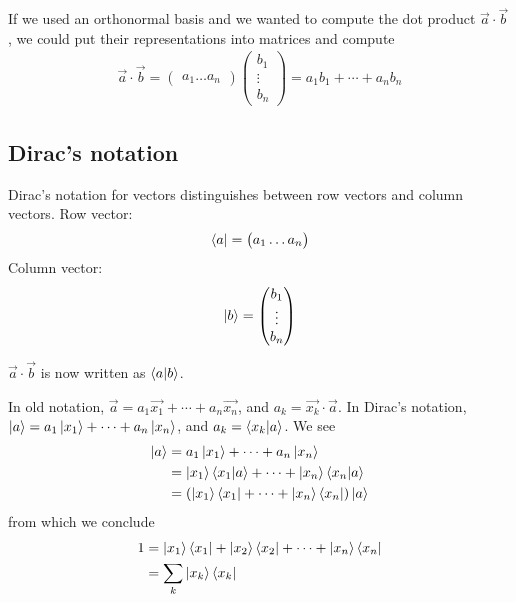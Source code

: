 \documentclass[12pt, oneside, letterpaper, fleqn]{article}
\begin{document}
If we used an orthonormal basis and we wanted to compute the dot product
$\vec{a} \cdot \vec{b}$, we could put their representations into
matrices and compute
\begin{align}
\vec{a} \cdot \vec{b} = \begin{pmatrix}
a_1 \hdots a_n
\end{pmatrix}
\begin{pmatrix}
b_1\\
\vdots\\
b_n
\end{pmatrix}
= a_1b_1 + \dotsb + a_nb_n
\end{align}

\subsection{Dirac's notation}
Dirac's notation for vectors distinguishes between row vectors and column
vectors. Row vector:
\begin{align}
\left\langle a\right\rvert = \begin{pmatrix}a_1 \hdots a_n\end{pmatrix}
\end{align}
Column vector:
\begin{align}
\left\lvert b\right\rangle = \begin{pmatrix}b_1\\
\vdots\\
b_n
\end{pmatrix}
\end{align}

$\vec{a} \cdot \vec{b}$ is now written as $\left\langle a\middle\vert b\right\rangle$.

In old notation, $\vec{a} = a_1\vec{x_1} +\dotsb+ a_n\vec{x_n}$, and
$a_k = \vec{x_k} \cdot \vec{a}$. In Dirac's notation, $\left\lvert a\right\rangle =
a_1\left\lvert x_1\right\rangle +\dotsb+ a_n\left\lvert x_n\right\rangle$, and $a_k = \left\langle x_k\middle\vert a\right\rangle$. We see
\begin{align*}
\left\lvert a\right\rangle &= a_1\left\lvert x_1\right\rangle +\dotsb+ a_n\left\lvert x_n\right\rangle\\
&= \left\lvert x_1\right\rangle\left\langle x_1\middle\vert a\right\rangle +\dotsb+ \left\lvert x_n\right\rangle\left\langle x_n\middle\vert a\right\rangle\\
&= \left(\left\lvert x_1\right\rangle\left\langle x_1\right\rvert +\dotsb+ \left\lvert x_n\right\rangle\left\langle x_n\right\rvert\right)\left\lvert a\right\rangle
\end{align*}
from which we conclude
\begin{align}\begin{split}\label{eq:finite_id}
1 &= \left\lvert x_1\right\rangle\left\langle x_1\right\rvert + \left\lvert x_2\right\rangle\left\langle x_2\right\rvert +\dotsb+ \left\lvert x_n\right\rangle\left\langle x_n\right\rvert\\
&= \sum_k \left\lvert x_k\right\rangle\left\langle x_k\right\rvert
\end{split}\end{align}
\end{document}
